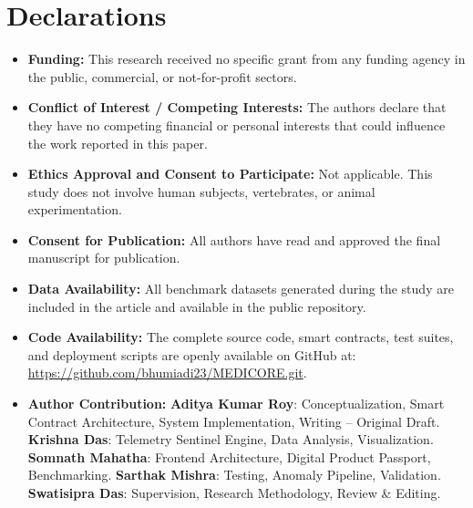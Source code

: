 \documentclass[11pt,a4paper]{article}
\begin{document}
\section*{Declarations}
\begin{itemize}
    \item \textbf{Funding:} This research received no specific grant from any funding agency in the public, commercial, or not-for-profit sectors.
    \item \textbf{Conflict of Interest / Competing Interests:} The authors declare that they have no competing financial or personal interests that could influence the work reported in this paper.
    \item \textbf{Ethics Approval and Consent to Participate:} Not applicable. This study does not involve human subjects, vertebrates, or animal experimentation.
    \item \textbf{Consent for Publication:} All authors have read and approved the final manuscript for publication.
    \item \textbf{Data Availability:} All benchmark datasets generated during the study are included in the article and available in the public repository.
    \item \textbf{Code Availability:} The complete source code, smart contracts, test suites, and deployment scripts are openly available on GitHub at: \url{https://github.com/bhumiadi23/MEDICORE.git}.
    \item \textbf{Author Contribution:} \textbf{Aditya Kumar Roy}: Conceptualization, Smart Contract Architecture, System Implementation, Writing -- Original Draft. \textbf{Krishna Das}: Telemetry Sentinel Engine, Data Analysis, Visualization. \textbf{Somnath Mahatha}: Frontend Architecture, Digital Product Passport, Benchmarking. \textbf{Sarthak Mishra}: Testing, Anomaly Pipeline, Validation. \textbf{Swatisipra Das}: Supervision, Research Methodology, Review \& Editing.
\end{itemize}
\end{document}
